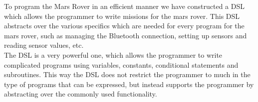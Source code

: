 To program the Mars Rover in an efficient manner we have constructed a DSL which
allows the programmer to write missions for the mars rover. This DSL abstracts
over the various specifics which are needed for every program for the mars 
rover, such as managing the Bluetooth connection, setting up sensors and reading
sensor values, etc. \\  

The DSL is a very powerful one, which allows the programmer to write complicated
programs using variables, constants, conditional statements and subroutines. 
This way the DSL does not restrict the programmer to much in the type of 
programs that can be expressed, but instead supports the programmer by 
abstracting over the commonly used functionality. \\  

